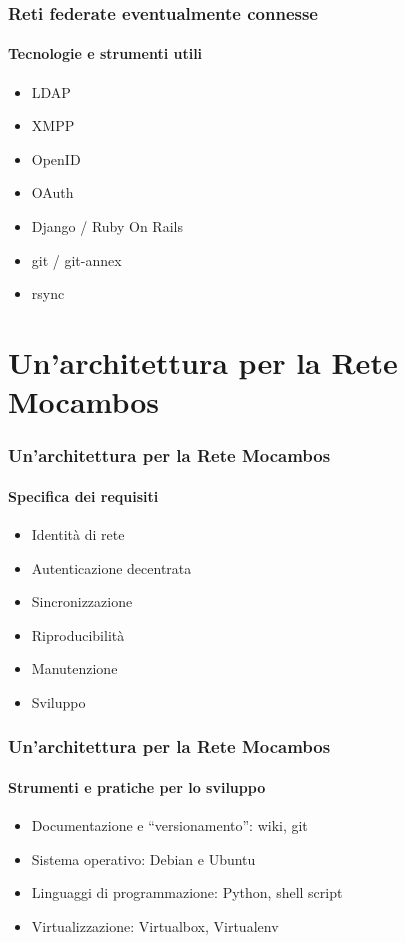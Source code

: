 \documentclass{beamer}
\begin{document}
{
\begin{frame}
  \frametitle{Reti federate eventualmente connesse}
  \framesubtitle{Tecnologie e strumenti utili}
  \begin{itemize}
    \item LDAP
    \item XMPP
    \item OpenID
    \item OAuth
    \item Django / Ruby On Rails
    \item git / git-annex
    \item rsync
    \end{itemize}
\end{frame}
}


\section{Un'architettura per la Rete Mocambos}

\begin{frame}
  \frametitle{Un'architettura per la Rete Mocambos}
  \framesubtitle{Specifica dei requisiti}
  \begin{itemize}
    \item Identità di rete
    \item Autenticazione decentrata
    \item Sincronizzazione
    \item Riproducibilità
    \item Manutenzione
    \item Sviluppo
    \end{itemize}

\end{frame}

\begin{frame}
  \frametitle{Un'architettura per la Rete Mocambos}
  \framesubtitle{Strumenti e pratiche per lo sviluppo}
  \begin{itemize}
    \item Documentazione e ``versionamento'': wiki, git
    \item Sistema operativo: Debian e Ubuntu
    \item Linguaggi di programmazione: Python, shell script
    \item Virtualizzazione: Virtualbox, Virtualenv
    \end{itemize}

\end{frame}
\end{document}
